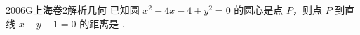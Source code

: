 
\begin{problem}{2006}{G}{上海卷}{2}{解析几何}
已知圆 $ x^2 - 4x - 4 + y^2 = 0 $ 的圆心是点 $ P $，则点 $ P $ 到直线 $ x - y - 1 = 0 $ 的距离是 \underline{\hspace{4em}}.
\end{problem}

\begin{answer}

\end{answer}

\begin{solutions}

\end{solutions}